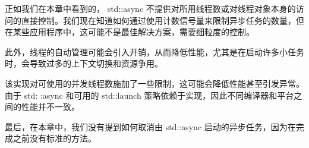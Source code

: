 正如我们在本章中看到的， std::async 不提供对所用线程数或对线程对象本身的访问的直接控制。我们现在知道如何通过使用计数信号量来限制异步任务的数量，但在某些应用程序中，这可能不是最佳解决方案，需要细粒度的控制。

此外，线程的自动管理可能会引入开销，从而降低性能，尤其是在启动许多小任务时，会导致过多的上下文切换和资源争用。

该实现对可使用的并发线程数施加了一些限制，这可能会降低性能甚至引发异常。由于 std: :async 和可用的 std::launch 策略依赖于实现，因此不同编译器和平台之间的性能并不一致。

最后，在本章中，我们没有提到如何取消由 std::async 启动的异步任务，因为在完成之前没有标准的方法。
